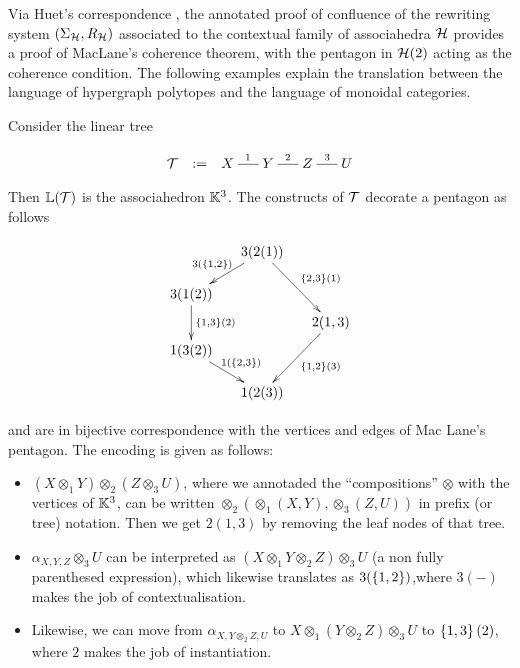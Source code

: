 Via Huet's correspondence \cite{Huet-notes-cat}, the annotated proof of confluence of the rewriting system $(\Sigma_{\mathcal{H}}, R_{\mathcal{H}})$ associated to the contextual family of associahedra $\mathcal{H}$ provides a proof of MacLane's coherence theorem, with the pentagon in $\mathcal{H}(2)$ acting as the coherence condition. 
The following examples explain the translation between the language of hypergraph polytopes and the language of monoidal categories. 

\begin{example}
Consider the linear tree

\vspace{-.7cm}
\begin{center}
$$\xymatrix @-1.65pc {{\cal T} & := &X \ar @{-}[rr]^{1}&& Y \ar @{-}[rr]^{2}&& Z \ar @{-}[rr]^{3}&& U}
  $$
\end{center}
Then ${\mathbb L}({\cal T})$ is the associahedron ${\mathbb K}^3$. 
The constructs of ${\cal T}$ decorate a pentagon as follows
\begin{center}
$$\xymatrix @-1.65pc {&& 3(2(1)) \ar @{->}[ddll]_{3(\set{1,2})} \ar @{->}[dddrr]^{\set{2,3}(1)}&& \\
 &&&&\\
3(1(2))   \ar @{->}[dd]^{\set{1,3}(2)}&&   && \\
 &&&&2(1,3) \ar @{->}[dddll]^{\set{1,2}(3)}\\
 1(3(2)) \ar @{->}[ddrr]^{1(\set{2,3})} &  &\\
 &&&&\\
 &&1(2(3))&&}$$
\end{center}
and are in bijective correspondence with the vertices and edges of Mac Lane's pentagon. 
The encoding is given as follows:
  \begin{itemize}
  \item $(X\otimes_1 Y)\otimes_2 (Z\otimes_3 U)$, where we annotaded the ``compositions'' $\otimes$ with the vertices of ${\mathbb K}^3$, can be written $\otimes_2(\otimes_1(X,Y),\otimes_3(Z,U))$ in prefix (or tree) notation. Then we get 
 $2(1,3)$ by removing the leaf nodes of that tree.
 \item $\alpha_{X,Y,Z}\otimes_3 U$ can be interpreted as $(X\otimes_1 Y\otimes_2 Z)\otimes_3 U$ (a non fully parenthesed expression), which likewise 
 translates as $3(\left\{1,2\right\})$,where $3(-)$ makes the job of contextualisation.
 \item Likewise, we can move from
$\alpha_{X,Y\otimes_2 Z,U}$ to $X\otimes_1(Y\otimes_2 Z)\otimes_3 U$ to $\left\{1,3\right\}(2)$, where $2$ makes the job of instantiation.
\end{itemize}
\end{example}


